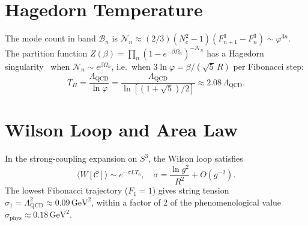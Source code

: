 \documentclass[
  aps,
  prd,
  reprint,
  superscriptaddress,
  nofootinbib,
  longbibliography,
  amsmath,
  amssymb
]{revtex4-2}
\theoremstyle{plain}
\theoremstyle{definition}
\theoremstyle{remark}
\newcommand{\vp}{\varphi}
\newcommand{\Lqcd}{\Lambda_{\mathrm{QCD}}}
\begin{document}
\section{Hagedorn Temperature}
\label{app:hagedorn}

The mode count in band $\mathcal{B}_n$ is
$\mathcal{N}_n\approx(2/3)(N_c^2-1)(F_{n+1}^3-F_n^3)\sim\vp^{3n}$.
The partition function $Z(\beta)=\prod_n(1-e^{-\beta\Omega_n})^{-\mathcal{N}_n}$
has a Hagedorn singularity~\cite{Hagedorn1965} when
$\mathcal{N}_n\sim e^{\beta\Omega_n}$, i.e.\ when
$3\ln\vp=\beta/(\sqrt5\,R)$ per Fibonacci step:
\begin{equation}
  T_H = \frac{\Lqcd}{\ln\vp}
      = \frac{\Lqcd}{\ln[(1+\sqrt5)/2]}
      \approx 2.08\,\Lqcd.
\end{equation}

\section{Wilson Loop and Area Law}
\label{app:wilson}

In the strong-coupling expansion on $S^3$, the Wilson loop satisfies
\begin{equation}
  \langle W[\mathcal{C}]\rangle\sim e^{-\sigma LT_0},\quad
  \sigma = \frac{\ln g^2}{R^2}+O(g^{-2}).
\end{equation}
The lowest Fibonacci trajectory ($F_1=1$) gives string tension
$\sigma_1=\Lqcd^2\approx0.09\,\mathrm{GeV}^2$, within a factor of 2
of the phenomenological value $\sigma_{\mathrm{phys}}\approx0.18\,\mathrm{GeV}^2$.
\end{document}
